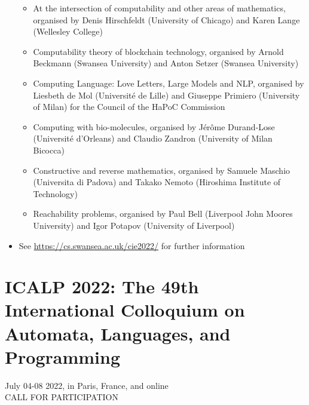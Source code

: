\documentclass[prodmode,acmtecs]{acmsmall} %
\begin{document}
\begin{itemize}
\begin{itemize}\item  At the intersection of computability and other areas of mathematics, organised by Denis Hirschfeldt (University of Chicago) and Karen Lange (Wellesley College)
\item  Computability theory of blockchain technology, organised by Arnold Beckmann (Swansea University) and Anton Setzer (Swansea University)
\item  Computing Language: Love Letters, Large Models and NLP, organised by Liesbeth de Mol (Université de Lille) and Giuseppe Primiero (University of Milan) for the Council of the HaPoC Commission
\item  Computing with bio-molecules, organised by Jérôme Durand-Lose (Université d'Orleans) and Claudio Zandron (University of Milan Bicocca)
\item  Constructive and reverse mathematics, organised by Samuele Maschio (Universita di Padova) and Takako Nemoto (Hiroshima Institute of Technology)
\item  Reachability problems, organised by Paul Bell (Liverpool John Moores University) and Igor Potapov (University of Liverpool)
\end{itemize} 
\item  See \href{https://cs.swansea.ac.uk/cie2022/}{https://cs.swansea.ac.uk/cie2022/} for further information 
 
\end{itemize}\section{ICALP 2022: The 49th International Colloquium on Automata, Languages, and Programming}\label{ICALP2022}  July 04-08  2022, in Paris, France, and online\\ 
CALL FOR PARTICIPATION 
\end{document}
